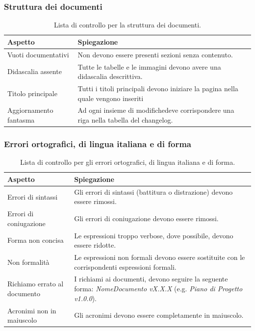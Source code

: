 \documentclass[8pt]{article}
\begin{document}
\subsubsection{Struttura dei documenti}
\renewcommand{\arraystretch}{2.5}
\begin{longtable}{|>{\centering}p{5cm}|>{\centering\arraybackslash}p{10cm}|}
\hline
\rowcolor{white}
    \textbf{Aspetto} & \textbf{Spiegazione} \\
\hline
\endfirsthead
\rowcolor{white}
\caption{Lista di controllo per la struttura dei documenti.}
\label{table:Lista di controllo per la struttura dei documenti}
\endlastfoot
    Vuoti documentativi & Non devono essere presenti sezioni senza contenuto. \\
\hline
    Didascalia assente & Tutte le tabelle e le immagini devono avere una didascalia descrittiva. \\
\hline    
Titolo principale & Tutti i titoli principali devono iniziare la pagina nella quale vengono
    inseriti \\
\hline
    Aggiornamento fantasma & Ad ogni insieme di modifichedeve corrispondere una riga nella tabella
    del changelog. \\
\hline
\end{longtable}
\subsubsection{Errori ortografici, di lingua italiana e di forma}
\renewcommand{\arraystretch}{2.5}
\begin{longtable}{|>{\centering}p{5cm}|>{\centering\arraybackslash}p{10cm}|}
\hline
\rowcolor{white}
    \textbf{Aspetto} & \textbf{Spiegazione} \\
\hline
\endfirsthead
\rowcolor{white}
\caption{Lista di controllo per gli errori ortografici, di lingua italiana e di forma.}
\label{table:Lista di controllo per gli errori ortografici, di lingua italiana e di forma}
\endlastfoot
    Errori di sintassi & Gli errori di sintassi (battitura o distrazione) devono essere rimossi.\\
\hline
    Errori di coniugazione & Gli errori di coniugazione devono essere rimossi. \\
\hline
    Forma non concisa & Le espressioni troppo verbose, dove possibile, devono essere ridotte.\\
\hline
    Non formalità & Le espressioni non formali devono essere sostituite con le corrispondenti
    espressioni formali. \\
\hline
    Richiamo errato al documento & I richiami ai documenti, devono seguire la seguente forma:
    \textit{NomeDocumento vX.X.X} (e.g. \textit{Piano di Progetto v1.0.0}).\\
\hline
    Acronimi non in maiuscolo & Gli acronimi devono essere completamente in maiuscolo. \\
\hline
\end{longtable}
\end{document}
